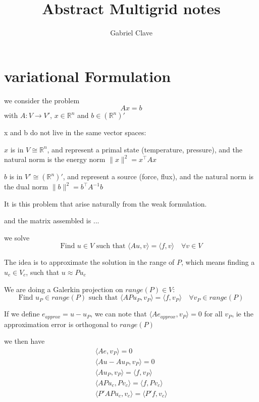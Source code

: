 \documentclass{article}
\begin{document}
\title{Abstract Multigrid notes}
\author{Gabriel Clave}
\maketitle

\tableofcontents

\section{variational Formulation}

we consider the problem
\[
    Ax = b
\]
with $ A: V \rightarrow V'$, $x \in \mathbb{R}^n$ and $b \in (\mathbb{R}^n)'$

x and b do not live in the same vector spaces:

$x$ is in $V \cong \mathbb{R}^n$, and represent a primal state (temperature, pressure), and the natural norm is the energy norm $\|x\|^2 = x^{\top}Ax$

$b$ is in $V' \cong (\mathbb{R}^n)'$, and represent a source (force, flux), and the natural norm is the dual norm $\|b\|^2 = b^{\top}A^{-1}b$


It is this problem that arise naturally from the weak formulation.

and the matrix assembled is ...

we solve
\[
    \text{Find } u \in V \text{ such that } \langle A u, v \rangle = \langle f, v \rangle \quad \forall v \in V
\]

The idea is to approximate the solution in the range of $P$, which means finding a $u_c \in V_c$, such that $u \approx Pu_c$

We are doing a Galerkin projection on $range(P) \in V$: 
$$\text{Find } u_P \in range(P) \text{ such that } \langle A P u_P, v_P \rangle = \langle f, v_P \rangle \quad \forall v_P \in range(P)$$

If we define $e_{approx} = u-u_P$, we can note that $\langle Ae_{approx}, v_P \rangle = 0$ for all $v_P$, ie the approximation error is orthogonal to $range(P)$

we then have
\begin{align*}
    \langle Ae, v_P \rangle = 0 \\
    \langle Au - Au_P, v_P \rangle = 0 \\
    \langle Au_P, v_P \rangle = \langle f, v_P \rangle \\
    \langle APu_c, Pv_c \rangle = \langle f, Pv_c \rangle \\
    \langle P'APu_c, v_c \rangle = \langle P'f, v_c \rangle \\
\end{align*}
\end{document}
